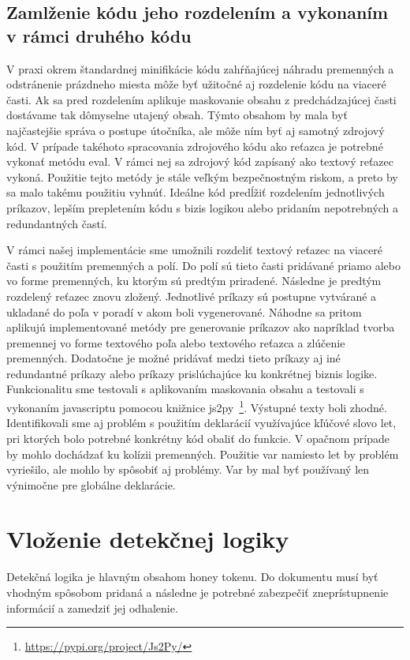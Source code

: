 \documentclass[conference, 11pt,slovak,a4paper,twoside]{IEEEtran}
\begin{document}
\subsection{Zamlženie kódu jeho rozdelením a vykonaním v rámci druhého kódu}

V praxi okrem štandardnej minifikácie kódu zahŕňajúcej náhradu premenných a odstránenie prázdneho miesta môže byť užitočné aj rozdelenie kódu na viaceré časti. Ak sa pred rozdelením aplikuje maskovanie obsahu z predchádzajúcej časti dostávame tak dômyselne utajený obsah. Týmto obsahom by mala byť najčastejšie správa o postupe útočníka, ale môže ním byť aj samotný zdrojový kód. V prípade takéhoto spracovania zdrojového kódu ako reťazca je potrebné vykonať metódu eval. V rámci nej sa zdrojový kód zapísaný ako textový reťazec vykoná. Použitie tejto metódy je stále veľkým bezpečnostným riskom, a preto by sa malo takému použitiu vyhnúť. Ideálne kód predĺžiť rozdelením jednotlivých príkazov, lepším prepletením kódu s bizis logikou alebo pridaním nepotrebných a redundantných častí.

V rámci našej implementácie sme umožnili rozdeliť textový reťazec na viaceré časti s použitím premenných a polí. Do polí sú tieto časti pridávané priamo alebo vo forme premenných, ku ktorým sú predtým priradené. Následne je predtým rozdelený reťazec znovu zložený. Jednotlivé príkazy sú postupne vytvárané a ukladané do poľa v poradí v akom boli vygenerované. Náhodne sa pritom aplikujú implementované metódy pre generovanie príkazov ako napríklad tvorba premennej vo forme textového poľa alebo textového reťazca a zlúčenie premenných. Dodatočne je možné pridávať medzi tieto príkazy aj iné redundantné príkazy alebo príkazy prislúchajúce ku konkrétnej biznis logike. Funkcionalitu sme testovali s aplikovaním maskovania obsahu a testovali s vykonaním javascriptu pomocou knižnice js2py~\footnote{\url{https://pypi.org/project/Js2Py/}}. Výstupné texty boli zhodné. Identifikovali sme aj problém s použitím deklarácií využívajúce kľúčové slovo let, pri ktorých bolo potrebné konkrétny kód obaliť do funkcie. V opačnom prípade by mohlo dochádzať ku kolízii premenných. Použitie var namiesto let by problém vyriešilo, ale mohlo by spôsobiť aj problémy. Var by mal byť používaný len výnimočne pre globálne deklarácie. 


\section{Vloženie detekčnej logiky}

Detekčná logika je hlavným obsahom honey tokenu. Do dokumentu musí byť vhodným spôsobom pridaná a následne je potrebné zabezpečiť zneprístupnenie informácií a zamedziť jej odhalenie.
\end{document}
